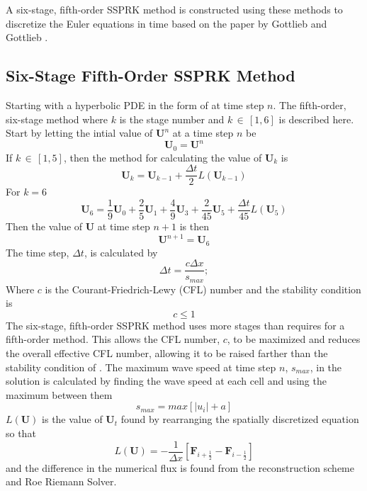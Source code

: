 A six-stage, fifth-order SSPRK method is constructed using these methods to discretize the Euler equations in time based on the paper by Gottlieb and Gottlieb \cite{GottliebandGottlieb}.
\subsection{Six-Stage Fifth-Order SSPRK Method}

Starting with a hyperbolic PDE in the form of  at time step $n$. The fifth-order, six-stage method where $k$ is the stage number and $k \, \in \, \left[1,6\right]$ is described here. Start by letting the intial value of $\boldsymbol{U}^n$ at a time step $n$ be
\begin{equation}
	\boldsymbol{U}_0 = \boldsymbol{U}^n
\end{equation}
If $ k \, \in \, \left[1,5\right]$, then the method for calculating the value of $\boldsymbol{U}_k$ is
\begin{equation}
	\boldsymbol{U}_{k} = \boldsymbol{U}_{k-1} + \frac{\Delta t}{2} L\left(\boldsymbol{U}_{k-1}\right)
\end{equation}
For $ k = 6$
\begin{equation}
	\boldsymbol{U}_{6} = \frac{1}{9} \boldsymbol{U}_{0} + \frac{2}{5} \boldsymbol{U}_{1} + \frac{4}{9} \boldsymbol{U}_{3} + \frac{2}{45} \boldsymbol{U}_{5} + \frac{\Delta t}{45} L\left(\boldsymbol{U}_{5}\right)
\end{equation}
Then the value of $\boldsymbol{U}$ at time step $n+1$ is then
\begin{equation}
	\boldsymbol{U}^{n+1} = \boldsymbol{U}_{6}
\end{equation}
The time step, $\Delta t$, is calculated by
\begin{equation}
	\Delta t = \frac{c \Delta x}{s_{max}};
\end{equation}
Where $c$ is the Courant-Friedrich-Lewy (CFL) number and the stability condition is
\begin{equation}\label{eq:cflcond}
	c \le 1
\end{equation}
The six-stage, fifth-order SSPRK method uses more stages than requires for a fifth-order method. This allows the CFL number, $c$, to be maximized and reduces the overall effective CFL number, allowing it to be raised farther than the stability condition of  \cite{Gottlieb2005}.  The maximum wave speed at time step $n$, $s_{max}$, in the solution is calculated by finding the wave speed at each cell and using the maximum between them
\begin{equation}
	s_{max} = max\left[\left|u_i\right|+a\right]
\end{equation}
$L\left(\boldsymbol{U}\right)$ is the value of $\boldsymbol{U}_t$ found by rearranging the spatially discretized equation  so that
\begin{equation}
	L\left(\boldsymbol{U}\right) = -\frac{1}{\Delta x} \left[\boldsymbol{F}_{i+\frac{1}{2}} - \boldsymbol{F}_{i-\frac{1}{2}}\right]
\end{equation}
and the difference in the numerical flux is found from the reconstruction scheme and Roe Riemann Solver.
